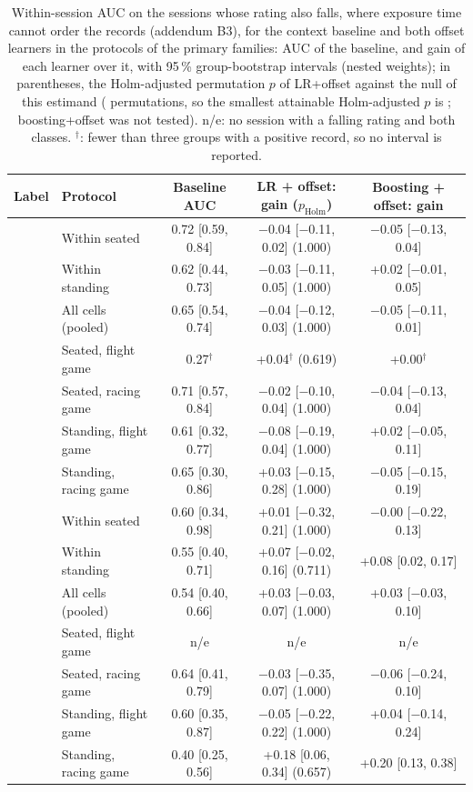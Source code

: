 \begin{table}[ht]
\centering
\scriptsize
\caption{Within-session AUC on the sessions whose rating also falls, where exposure time cannot order the records (addendum B3), for the context baseline and both offset learners in the protocols of the primary families: AUC of the baseline, and gain of each learner over it, with 95\,\% group-bootstrap intervals (nested weights); in parentheses, the Holm-adjusted permutation $p$ of LR+offset against the null of this estimand ( permutations, so the smallest attainable Holm-adjusted $p$ is ; boosting+offset was not tested). n/e: no session with a falling rating and both classes. $^\dagger$: fewer than three groups with a positive record, so no interval is reported.}
\label{tab:supp_falling}
\setlength{\tabcolsep}{3pt}
\begin{tabular}{@{}llccc@{}}
\toprule
Label & Protocol & Baseline AUC & LR + offset: gain ($p_\mathrm{Holm}$) & Boosting + offset: gain \\
\midrule
\sevtwo{} & Within seated & 0.72 [0.59, 0.84] & $-$0.04 [$-$0.11, 0.02] (1.000) & $-$0.05 [$-$0.13, 0.04] \\
 & Within standing & 0.62 [0.44, 0.73] & $-$0.03 [$-$0.11, 0.05] (1.000) & +0.02 [$-$0.01, 0.05] \\
 & All cells (pooled) & 0.65 [0.54, 0.74] & $-$0.04 [$-$0.12, 0.03] (1.000) & $-$0.05 [$-$0.11, 0.01] \\
 & Seated, flight game & 0.27$^\dagger$ & +0.04$^\dagger$ (0.619) & +0.00$^\dagger$ \\
 & Seated, racing game & 0.71 [0.57, 0.84] & $-$0.02 [$-$0.10, 0.04] (1.000) & $-$0.04 [$-$0.13, 0.04] \\
 & Standing, flight game & 0.61 [0.32, 0.77] & $-$0.08 [$-$0.19, 0.04] (1.000) & +0.02 [$-$0.05, 0.11] \\
 & Standing, racing game & 0.65 [0.30, 0.86] & +0.03 [$-$0.15, 0.28] (1.000) & $-$0.05 [$-$0.15, 0.19] \\
\midrule
\sevone{} & Within seated & 0.60 [0.34, 0.98] & +0.01 [$-$0.32, 0.21] (1.000) & $-$0.00 [$-$0.22, 0.13] \\
 & Within standing & 0.55 [0.40, 0.71] & +0.07 [$-$0.02, 0.16] (0.711) & +0.08 [0.02, 0.17] \\
 & All cells (pooled) & 0.54 [0.40, 0.66] & +0.03 [$-$0.03, 0.07] (1.000) & +0.03 [$-$0.03, 0.10] \\
 & Seated, flight game & n/e & n/e & n/e \\
 & Seated, racing game & 0.64 [0.41, 0.79] & $-$0.03 [$-$0.35, 0.07] (1.000) & $-$0.06 [$-$0.24, 0.10] \\
 & Standing, flight game & 0.60 [0.35, 0.87] & $-$0.05 [$-$0.22, 0.22] (1.000) & +0.04 [$-$0.14, 0.24] \\
 & Standing, racing game & 0.40 [0.25, 0.56] & +0.18 [0.06, 0.34] (0.657) & +0.20 [0.13, 0.38] \\
\bottomrule
\end{tabular}
\end{table}